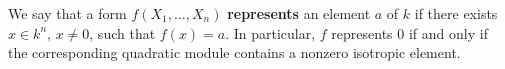 We say that a form $f(X_1, \ldots, X_n)$ \textbf{represents} an element $a$ of $k$ if there exists $x \in k^n$, $x \neq 0$, such that $f(x) = a$. In particular, $f$ represents $0$ if and only if the corresponding quadratic module contains a nonzero isotropic element.
